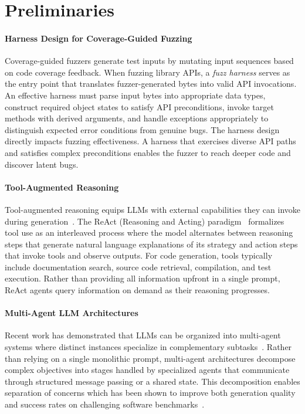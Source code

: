 
\section{Preliminaries}

\paragraph{Harness Design for Coverage-Guided Fuzzing}
Coverage-guided fuzzers generate test inputs by mutating input sequences based on code coverage feedback. When fuzzing library APIs, a \emph{fuzz harness} serves as the entry point that translates fuzzer-generated bytes into valid API invocations. An effective harness must parse input bytes into appropriate data types, construct required object states to satisfy API preconditions, invoke target methods with derived arguments, and handle exceptions appropriately to distinguish expected error conditions from genuine bugs. The harness design directly impacts fuzzing effectiveness. A harness that exercises diverse API paths and satisfies complex preconditions enables the fuzzer to reach deeper code and discover latent bugs.

\paragraph{Tool-Augmented Reasoning}
Tool-augmented reasoning equips LLMs with external capabilities they can invoke during generation~\cite{DBLP:conf/nips/SchickDDRLHZCS23:Toolformer}. The ReAct (Reasoning and Acting) paradigm~\cite{DBLP:conf/iclr/YaoZYDSN023:ReAct} formalizes tool use as an interleaved process where the model alternates between reasoning steps that generate natural language explanations of its strategy and action steps that invoke tools and observe outputs. For code generation, tools typically include documentation search, source code retrieval, compilation, and test execution. Rather than providing all information upfront in a single prompt, ReAct agents query information on demand as their reasoning progresses.

\paragraph{Multi-Agent LLM Architectures}
Recent work has demonstrated that LLMs can be organized into multi-agent systems where distinct instances specialize in complementary subtasks~\cite{DBLP:journals/corr/abs-2312-13010:AgentCoder}. Rather than relying on a single monolithic prompt, multi-agent architectures decompose complex objectives into stages handled by specialized agents that communicate through structured message passing or a shared state. This decomposition enables separation of concerns which has been shown to improve both generation quality and success rates on challenging software benchmarks~\cite{DBLP:conf/iclr/0036YZXLL0DMYZ024:AgentBench}.

